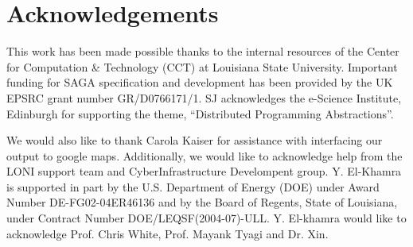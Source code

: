 \documentclass[conference,final]{IEEEtran}
\begin{document}


\section{Acknowledgements}

This work has been made possible thanks to the internal resources of
the Center for Computation \& Technology (CCT) at Louisiana State
University.  Important funding for SAGA specification and development
has been provided by the UK EPSRC grant number GR/D0766171/1.  SJ
acknowledges the e-Science Institute, Edinburgh for supporting the
theme, ``Distributed Programming Abstractions''.  

We would also like to thank Carola Kaiser for assistance with
interfacing our output to google maps. Additionally, we would like to
acknowledge help from the LONI support team and CyberInfrastructure
Develompent group.  Y. El-Khamra is supported in part by the U.S.
Department of Energy (DOE) under Award Number DE-FG02-04ER46136 and by
the Board of Regents, State of Louisiana, under Contract Number
DOE/LEQSF(2004-07)-ULL.  Y.  El-khamra would like to acknowledge Prof.
Chris White, Prof. Mayank Tyagi and Dr. Xin.



\end{document}
